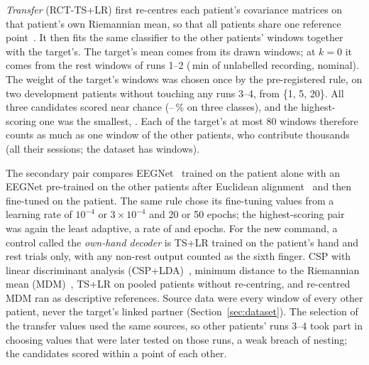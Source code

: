 \emph{Transfer} (RCT-TS+LR) first re-centres each patient's covariance
matrices on that patient's own Riemannian mean, so that all patients share
one reference point~\cite{zanini2018}. It then fits the same classifier to the
other patients' windows together with the target's. The target's mean comes
from its drawn windows; at $k = 0$ it comes from the rest windows of runs
1--2 (\rqTwoRestMinutes\,min of unlabelled recording, nominal). The weight of
the target's windows was chosen once by the pre-registered rule, on two
development patients without touching any runs 3--4, from \{1, 5, 20\}. All
three candidates scored near chance (\rqTwoHparamRctTslrMeanMin--\rqTwoHparamRctTslrMeanMax\,\%
on three classes), and the highest-scoring one was the smallest,
\rqTwoHparamRctTslrWeight. Each of the target's at most 80 windows therefore
counts as much as one window of the other patients, who contribute thousands
(all their sessions; the dataset has \nWindows{} windows).

The secondary pair compares EEGNet~\cite{lawhern2018} trained on the patient
alone with an EEGNet pre-trained on the other patients after Euclidean
alignment~\cite{he2020} and then fine-tuned on the patient. The same rule
chose its fine-tuning values from a learning rate of $10^{-4}$ or
$3\times10^{-4}$ and 20 or 50 epochs; the highest-scoring pair was again the
least adaptive, a rate of \rqTwoHparamEegnetLr{} and \rqTwoHparamEegnetEpochs{}
epochs. For the new
command, a control called the \emph{own-hand decoder} is TS+LR trained on the
patient's hand and rest trials only, with any non-rest output counted as the
sixth finger. CSP with linear discriminant analysis
(CSP+LDA)~\cite{ramoser2000}, minimum distance to the Riemannian mean
(MDM)~\cite{barachant2012}, TS+LR on pooled patients without re-centring, and
re-centred MDM ran as descriptive references. Source data were every window
of every other patient, never the target's linked partner
(Section~\ref{sec:dataset}). The selection of the transfer values used the
same sources, so other patients' runs 3--4 took part in choosing values that
were later tested on those runs, a weak breach of nesting; the candidates
scored within a point of each other.

